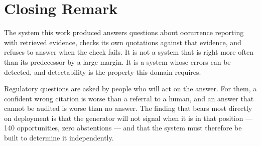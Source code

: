 \section{Closing Remark}

The system this work produced answers questions about occurrence reporting with
retrieved evidence, checks its own quotations against that evidence, and refuses
to answer when the check fails. It is not a system that is right more often than
its predecessor by a large margin. It is a system whose errors can be detected, and detectability is the property
this domain requires.

Regulatory questions are asked by people who will act on the answer. For them,
a confident wrong citation is worse than a referral to a human, and an answer
that cannot be audited is worse than no answer. The finding that bears most directly on deployment is that the generator will
not signal when it is in that position ---
140 opportunities, zero abstentions --- and that the system must therefore be built
to determine it independently.
